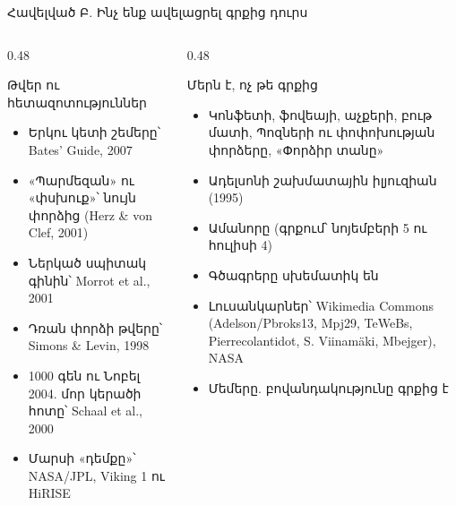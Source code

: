 \begin{frame}{Հավելված Բ. Ինչ ենք ավելացրել գրքից դուրս}
  \begin{columns}[T]
    \begin{column}{0.48\textwidth}
      \begin{card}[colback=mint!30!cardwhite, fontupper=\scriptsize]
        {\blackfont Թվեր ու հետազոտություններ}\par\smallskip
        \begin{itemize}\setlength{\itemsep}{0.3mm}
          \item Երկու կետի շեմերը՝ Bates' Guide, 2007
          \item «Պարմեզան» ու «փսխուք»՝ նույն փորձից (Herz \& von Clef, 2001)
          \item Ներկած սպիտակ գինին՝ Morrot et al., 2001
          \item Դռան փորձի թվերը՝ Simons \& Levin, 1998
          \item 1000 գեն ու Նոբել 2004. մոր կերածի հոտը՝ Schaal et al., 2000
          \item Մարսի «դեմքը»՝ NASA/JPL, Viking 1 ու HiRISE
        \end{itemize}
      \end{card}
    \end{column}
    \begin{column}{0.48\textwidth}
      \begin{card}[colback=peach!35!cardwhite, fontupper=\scriptsize]
        {\blackfont Մերն է, ոչ թե գրքից}\par\smallskip
        \begin{itemize}\setlength{\itemsep}{0.3mm}
          \item Կոնֆետի, ֆովեայի, աչքերի, բութ մատի, Պոզների ու փոփոխության փորձերը, «Փորձիր տանը»
          \item Ադելսոնի շախմատային իլյուզիան (1995)
          \item Ամանորը (գրքում՝ նոյեմբերի 5 ու հուլիսի 4)
          \item Գծագրերը սխեմատիկ են
          \item Լուսանկարներ՝ Wikimedia Commons (Adelson/Pbroks13, Mpj29, TeWeBs, Pierrecolantidot, S. Viinamäki, Mbejger), NASA
          \item Մեմերը. բովանդակությունը գրքից է
        \end{itemize}
      \end{card}
    \end{column}
  \end{columns}
\end{frame}

